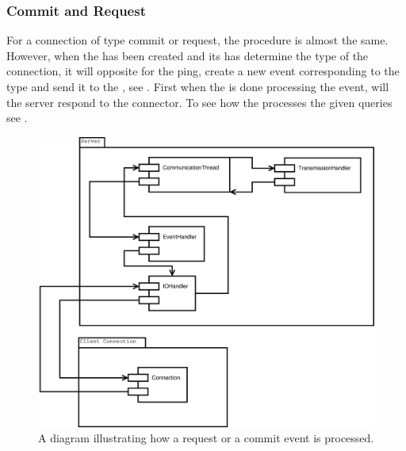 \subsubsection{Commit and Request}
\label{sec:IOCR}
For a connection of type commit or request, the procedure is almost the same. However, when the  has been created and its  has determine the type of the connection, it will opposite for the ping, create a new event corresponding to the type and send it to the , see .
First when the  is done processing the event, will the server respond to the connector.
To see how the  processes the given queries see .

\begin{figure}[htbp]
	\centering
		\includegraphics[scale=0.30]{images/requestCommit.eps} %
	\caption{A diagram illustrating how a request or a commit event is processed.}
	\label{fig:IOCR}
\end{figure}